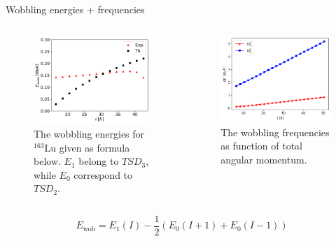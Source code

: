 \documentclass{beamer}
\begin{document}
\begin{frame}{Wobbling energies + frequencies}
\begin{columns} 
\begin{figure}
    \centering
    \includegraphics[scale=0.38]{figs/wobbling_energy_ThExp.pdf}
    \caption{The wobbling energies for $^{163}$Lu given as formula below. $E_1$ belong to $TSD_3$, while $E_0$ correspond to $TSD_2$.}
    \label{wobbling-energies_th_exp}
\end{figure}
\begin{figure}
\includegraphics[scale=0.4]{figs/wobbling-frequencies.pdf}
\caption{The wobbling frequencies as function of total angular momentum.}
\end{figure}
\end{columns}
$$E_\text{wob}=E_1(I)-\frac{1}{2}(E_0(I+1)+E_0(I-1))$$
\end{frame}
\end{document}

